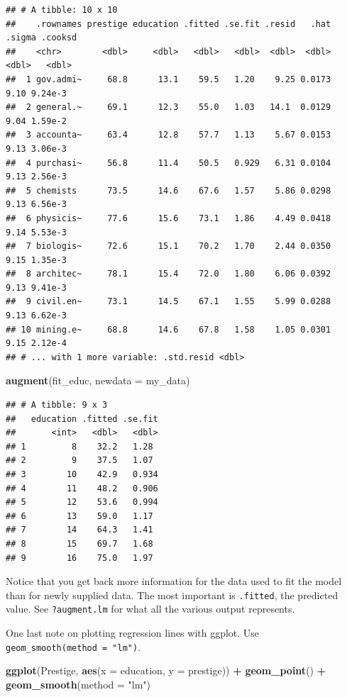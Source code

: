 \documentclass[
  12pt,
  oneside,openany]{book}
\newenvironment{Shaded}{\begin{snugshade}}{\end{snugshade}}
\newcommand{\DataTypeTok}[1]{\textcolor[rgb]{0.13,0.29,0.53}{#1}}
\newcommand{\KeywordTok}[1]{\textcolor[rgb]{0.13,0.29,0.53}{\textbf{#1}}}
\newcommand{\NormalTok}[1]{#1}
\newcommand{\OperatorTok}[1]{\textcolor[rgb]{0.81,0.36,0.00}{\textbf{#1}}}
\newcommand{\StringTok}[1]{\textcolor[rgb]{0.31,0.60,0.02}{#1}}
\begin{document}
\begin{verbatim}
## # A tibble: 10 x 10
##    .rownames prestige education .fitted .se.fit .resid   .hat .sigma .cooksd
##    <chr>        <dbl>     <dbl>   <dbl>   <dbl>  <dbl>  <dbl>  <dbl>   <dbl>
##  1 gov.admi~     68.8      13.1    59.5   1.20    9.25 0.0173   9.10 9.24e-3
##  2 general.~     69.1      12.3    55.0   1.03   14.1  0.0129   9.04 1.59e-2
##  3 accounta~     63.4      12.8    57.7   1.13    5.67 0.0153   9.13 3.06e-3
##  4 purchasi~     56.8      11.4    50.5   0.929   6.31 0.0104   9.13 2.56e-3
##  5 chemists      73.5      14.6    67.6   1.57    5.86 0.0298   9.13 6.56e-3
##  6 physicis~     77.6      15.6    73.1   1.86    4.49 0.0418   9.14 5.53e-3
##  7 biologis~     72.6      15.1    70.2   1.70    2.44 0.0350   9.15 1.35e-3
##  8 architec~     78.1      15.4    72.0   1.80    6.06 0.0392   9.13 9.41e-3
##  9 civil.en~     73.1      14.5    67.1   1.55    5.99 0.0288   9.13 6.62e-3
## 10 mining.e~     68.8      14.6    67.8   1.58    1.05 0.0301   9.15 2.12e-4
## # ... with 1 more variable: .std.resid <dbl>
\end{verbatim}

\begin{Shaded}
\begin{Highlighting}[]
\KeywordTok{augment}\NormalTok{(fit\_educ,}
        \DataTypeTok{newdata =}\NormalTok{ my\_data)}
\end{Highlighting}
\end{Shaded}

\begin{verbatim}
## # A tibble: 9 x 3
##   education .fitted .se.fit
##       <int>   <dbl>   <dbl>
## 1         8    32.2   1.28 
## 2         9    37.5   1.07 
## 3        10    42.9   0.934
## 4        11    48.2   0.906
## 5        12    53.6   0.994
## 6        13    59.0   1.17 
## 7        14    64.3   1.41 
## 8        15    69.7   1.68 
## 9        16    75.0   1.97
\end{verbatim}

Notice that you get back more information for the data used to fit the model than for newly supplied data. The most important is \texttt{.fitted}, the predicted value. See \texttt{?augment.lm} for what all the various output represents.

One last note on plotting regression lines with ggplot. Use \texttt{geom\_smooth(method\ =\ "lm")}.

\begin{Shaded}
\begin{Highlighting}[]
\KeywordTok{ggplot}\NormalTok{(Prestige, }\KeywordTok{aes}\NormalTok{(}\DataTypeTok{x =}\NormalTok{ education, }\DataTypeTok{y =}\NormalTok{ prestige)) }\OperatorTok{+}
\StringTok{  }\KeywordTok{geom\_point}\NormalTok{() }\OperatorTok{+}
\StringTok{  }\KeywordTok{geom\_smooth}\NormalTok{(}\DataTypeTok{method =} \StringTok{"lm"}\NormalTok{)}
\end{Highlighting}
\end{Shaded}
\end{document}
